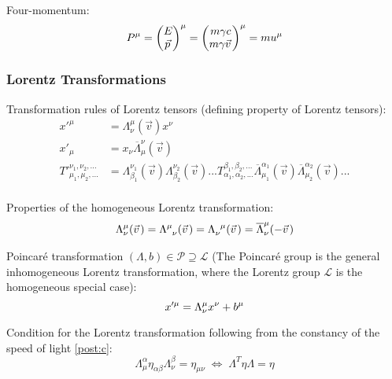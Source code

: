 			\noindent
			Four-momentum:
			\begin{equation}
				P^\mu =
				\mqty(
				E \\ \vec{p}
				)^\mu
				= \mqty(
				m\gamma c \\ m\gamma\vec{v}
				)^\mu
				= m u^\mu
			\end{equation}

		\subsubsection{Lorentz Transformations}
			\noindent
			Transformation rules of Lorentz tensors (defining property of Lorentz tensors):
			\begin{equation}
				\begin{aligned}
					{x'}^\mu &= \Lambda^{\mu}_{\nu}(\vec{v}) x^\nu \\
					{x'}_\mu &=  x_\nu \overline{\Lambda}_\mu^{\nu}(\vec{v}) \\
					{T'}_{\mu_1,\mu_2,...}^{\nu_1,\nu_2,...} &=  \Lambda^{\nu_1}_{\beta_1}(\vec{v}) \Lambda^{\nu_2}_{\beta_2}(\vec{v}) ... T_{\alpha_1,\alpha_2,...}^{\beta_1,\beta_2,...} \overline{\Lambda}_{\mu_1}^{\alpha_1}(\vec{v}) \overline{\Lambda}_{\mu_2}^{\alpha_2}(\vec{v}) ... \\
				\end{aligned}
			\end{equation}

			\noindent
			Properties of the homogeneous Lorentz transformation:
			\begin{equation}
				\Lambda^{\mu}_{\nu}(\vec{v}) = \Lambda^{\mu}_{\phantom{\mu}\nu}(\vec{v}) = \Lambda^{\phantom{\nu}\mu}_{\nu}(\vec{v}) = \overline{\Lambda}^{\mu}_{\nu}(-\vec{v}) \\
			\end{equation}

			\noindent
			Poincaré transformation $(\Lambda, b) \in\mathcal{P} \supseteq \mathcal{L}$ (The Poincaré group is the general inhomogeneous Lorentz transformation, where the Lorentz group $\mathcal{L}$ is the homogeneous special case):
			\begin{equation}
				x'^\mu = \Lambda^\mu_{\nu} x^\nu + b^\mu \\
			\end{equation}

			\noindent
			Condition for the Lorentz transformation following from the constancy of the speed of light \ref{post:c}:
			\begin{equation}
				\Lambda^{\alpha}_{\mu} \eta_{\alpha\beta} \Lambda^{\beta}_{\nu} = \eta_{\mu\nu}
				\;\Leftrightarrow\; \Lambda^T \eta \Lambda = \eta
			\end{equation}

